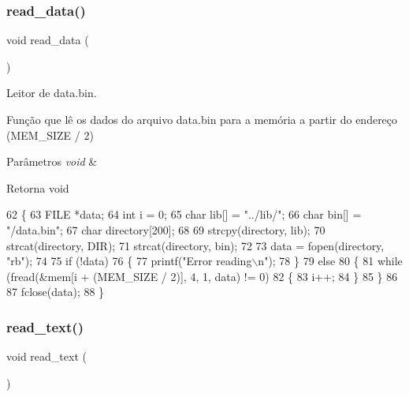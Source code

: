 \subsubsection{read\+\_\+data()}
{\footnotesize\ttfamily void read\+\_\+data (\begin{DoxyParamCaption}\item[{void}]{ }\end{DoxyParamCaption})}



Leitor de data.\+bin. 

Função que lê os dados do arquivo data.\+bin para a memória a partir do endereço (M\+E\+M\+\_\+\+S\+I\+ZE / 2) 
\begin{DoxyParams}{Parâmetros}
{\em void} & \\
\hline
\end{DoxyParams}
\begin{DoxyReturn}{Retorna}
void 
\end{DoxyReturn}

\begin{DoxyCode}
62 \{
63     FILE *data;
64     \textcolor{keywordtype}{int} i = 0;
65     \textcolor{keywordtype}{char} lib[] = \textcolor{stringliteral}{"../lib/"};
66     \textcolor{keywordtype}{char} bin[] = \textcolor{stringliteral}{"/data.bin"};
67     \textcolor{keywordtype}{char} directory[200];
68 
69     strcpy(directory, lib);
70     strcat(directory, DIR);
71     strcat(directory, bin);
72 
73     data = fopen(directory, \textcolor{stringliteral}{"rb"});
74 
75     \textcolor{keywordflow}{if} (!data)
76     \{
77         printf(\textcolor{stringliteral}{"Error reading\(\backslash\)n"});
78     \}
79     \textcolor{keywordflow}{else}
80     \{
81         \textcolor{keywordflow}{while} (fread(&mem[i + (MEM_SIZE / 2)], 4, 1, data) != 0)
82         \{
83             i++;
84         \}
85     \}
86 
87     fclose(data);
88 \}
\end{DoxyCode}
\mbox{\label{init_8c_ad88dca553e1e9f42d69c2443245dbcbe}} 
\subsubsection{read\+\_\+text()}
{\footnotesize\ttfamily void read\+\_\+text (\begin{DoxyParamCaption}\item[{void}]{ }\end{DoxyParamCaption})}



